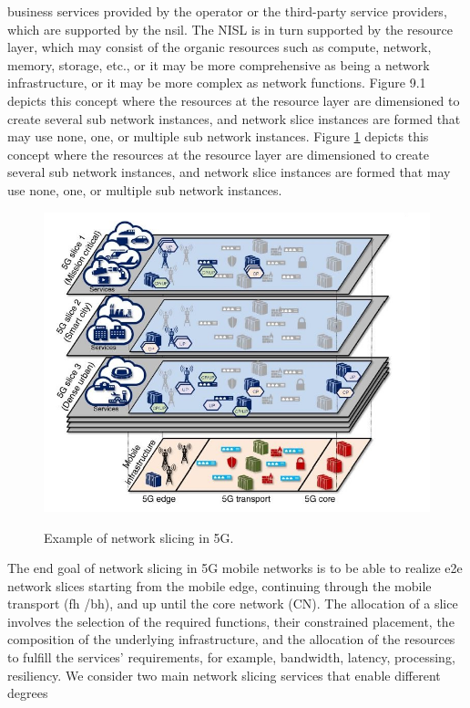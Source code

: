 \documentclass{article}
\begin{document}
business services provided by the operator or the third-party service providers,
which are supported by the \gls{nsil}. The NISL
is in turn supported by the resource layer, which may consist of the organic
resources such as compute, network, memory, storage, etc., or it may be more
comprehensive as being a network infrastructure, or it may be more complex
as network functions. Figure 9.1 depicts this concept where the resources at
the resource layer are dimensioned to create several sub network instances,
and network slice instances are formed that may use none, one, or multiple sub
network instances. Figure \ref{layers} depicts this concept where the resources at
the resource layer are dimensioned to create several sub network instances,
and network slice instances are formed that may use none, one, or multiple sub
network instances. 
\begin{figure}
\centering
\includegraphics[scale=0.5]{pics/1.JPG}
\label{layers}
\caption{Example of network slicing in 5G.} 
\end{figure}
The end goal of network slicing in 5G mobile networks is to be able to realize
\gls{e2e} network slices starting from the mobile edge, continuing
through the mobile transport (\gls{fh} /\gls{bh}), and up until
the core network (CN). The allocation of a slice involves the selection of the
required functions, their constrained placement, the composition of the underlying infrastructure, and the allocation of the resources to fulfill the services' requirements, for example, bandwidth, latency, processing, resiliency.
We consider two main network slicing services that enable different degrees
\end{document}
